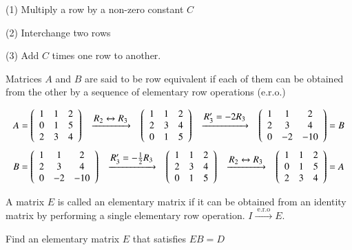 \documentclass[12pt]{article}
\newcommand{\ro}[2][]{
\tab \xrightarrow[\scalebox{1}{$#1$}]{\scalebox{1}{$#2$}} \tab
}
\renewenvironment{pmatrix}
{\left(\begin{array}{ccc}}
{\end{array}\right)}
\begin{document}
\tabs (1) Multiply a row by a non-zero constant $C$

\tabs (2) Interchange two rows

\tabs (3) Add $C$ times one row to another.

Matrices $A$ and $B$ are said to be row equivalent if each of them can be obtained from the other by a sequence of elementary row operations (e.r.o.)

\begin{equation*}
A= \begin{pmatrix}
   1 & 1 & 2 \\ 0 & 1 & 5 \\ 2 & 3 & 4
\end{pmatrix} 
\ro{R_2 \leftrightarrow R_3}
\begin{pmatrix}
   1 & 1 & 2 \\ 2 & 3 & 4 \\ 0 & 1 & 5
\end{pmatrix}
\ro{R_3' = -2R_3}
\begin{pmatrix}
   1 & 1 & 2 \\ 2 & 3 & 4 \\ 0 & -2 & -10
\end{pmatrix} =B
\end{equation*}
\begin{equation*}
B= \begin{pmatrix}
   1 & 1 & 2 \\ 2 & 3 & 4 \\ 0 & -2 & -10
\end{pmatrix} 
\ro{R_3' = -\frac{1}{2}R_3}
\begin{pmatrix}
   1 & 1 & 2 \\ 2 & 3 & 4 \\ 0 & 1 & 5
\end{pmatrix}
\ro{R_2 \leftrightarrow R_3}
\begin{pmatrix}
   1 & 1 & 2 \\ 0 & 1 & 5 \\ 2 & 3 & 4
\end{pmatrix} =A
\end{equation*}

A matrix $E$ is called an elementary matrix if it can be obtained from an identity matrix by performing a single elementary row operation. $I \stackrel{\text{ \ e.r.o \ }}{\longrightarrow} E$.


\vspace{3ex}
 Find an elementary matrix $E$ that satisfies $EB=D$
\end{document}
